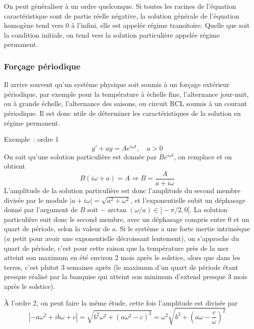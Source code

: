 \documentclass[a4paper,11pt]{article}
\begin{document}
On peut g\'en\'eraliser \`a un ordre quelconque.
Si toutes les racines de l'\'equation caract\'eristique sont
de partie r\'eelle n\'egative, la solution g\'en\'erale
de l'\'equation homog\`ene tend vers 0 \`a l'infini,
elle est appel\'ee r\'egime transitoire. Quelle que
soit la condition initiale, on tend vers la solution particuli\`ere
appel\'ee r\'egime permanent.

\subsubsection{For\c{c}age p\'eriodique}
Il arrive souvent qu'un syst\`eme physique soit soumis \`a
un for\c{c}age ext\'erieur p\'eriodique, par exemple
pour la temp\'erature \`a \'echelle fine, l'alternance jour-nuit,
ou \`a grande \'echelle, l'alternance des saisons, ou
circuit RCL soumis \`a un courant p\'eriodique. Il est donc
utile de d\'eterminer les caract\'eristiques de la solution
en r\'egime permanent.

Exemple~: ordre 1
$$ y'+ay=A e^{i\omega t}, \quad a>0$$
On sait qu'une solution particuli\`ere est donn\'ee par
$ B e^{i \omega t}$, on remplace et on obtient
$$ B(i\omega +a)=A \Rightarrow B=\frac{A}{a+i\omega}$$
L'amplitude de la solution particuli\`ere est donc l'amplitude
du second membre divis\'ee par le module 
$|a+i\omega|=\sqrt{a^2+\omega^2}$, et l'exponentielle subit
un d\'ephasage donn\'e par l'argument de $B$ soit
$-\arctan(\omega/a) \in ]-\pi/2,0[$. La solution
particuli\`ere suit donc le second membre, avec un d\'ephasage
compris entre 0 et un quart de p\'eriode, selon la valeur de $a$.
Si le syst\`eme a une forte inertie intrins\`eque ($a$ petit
pour avoir une exponentielle d\'ecroissant lentement), on s'approche
du quart de p\'eriode, c'est pour cette raison que la temp\'erature
pr\`es de la mer atteint son maximum en \'et\'e environ 2 mois
apr\`es le solstice, alors que dans les terres, c'est plutot 3
semaines apr\`es (le maximum d'un quart de p\'eriode
\'etant presque r\'ealis\'e par la banquise qui atteint son
minimum d'extend presque 3 mois apr\`es le solstice).

\`A l'ordre 2, on peut faire la m\^eme \'etude, cette fois l'amplitude
est divis\'ee par
$$|-a\omega^2+ib\omega+c|
=\sqrt{ b^2\omega^2+(a\omega^2-c)^2}
=\omega^2 \sqrt{ b^2+(a\omega-\frac{c}{\omega})^2}$$
\end{document}

